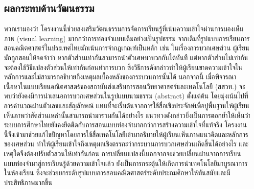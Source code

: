 \subsection*{ผลกระทบด้านวัฒนธรรม}
พวกเรามองว่า โครงงานนี้ช่วยส่งเสริมวัฒนธรรมการจัดการเรียนรู้ที่เน้นความเข้าใจผ่านการมองเห็นภาพ (visual learning) มากกว่าการท่องจำแบบเดิมอย่างเป็นรูปธรรม
จากเดิมที่รูปแบบการเรียนการสอนคณิตศาสตร์ในประเทศไทยมักเน้นการจำกฎเกณฑ์เป็นหลัก เช่น ในเรื่องการบวกเศษส่วน ผู้เรียนมักถูกสอนให้จดจำว่า หากตัวส่วนเท่ากันสามารถนำตัวเศษมาบวกกันได้ทันที 
แต่หากตัวส่วนไม่เท่ากัน จะต้องใช้วิธีแปลงตัวส่วนให้เท่ากันก่อนทำการบวก ซึ่งวิธีการดังกล่าวทำให้ผู้เรียนขาดความเข้าใจในหลักการและไม่สามารถอธิบายถึงเหตุผลเบื้องหลังของกระบวนการนั้นได้
นอกจากนี้ เมื่อพิจารณาเนื้อหาในแบบเรียนคณิตศาสตร์ของสถาบันส่งเสริมการสอนวิทยาศาสตร์และเทคโนโลยี (สสวท.) จะพบว่ายังคงมีการนำเสนอการบวกเศษส่วนในรูปแบบนามธรรม (abstract) ตั้งแต่ต้น 
โดยมุ่งเน้นไปที่การคำนวณผ่านตัวเลขและสัญลักษณ์ แทนที่จะเริ่มต้นจากการใช้สื่อเชิงประจักษ์เพื่อปูพื้นฐานให้ผู้เรียนเห็นภาพว่าสัดส่วนเหล่านั้นสามารถนำมารวมกันได้อย่างไร 
แนวทางดังกล่าวยิ่งเป็นการตอกย้ำให้เห็นว่าระบบการศึกษาไทยยังคงยึดติดกับการสอนแบบท่องจำมากกว่าการสร้างความเข้าใจที่แท้จริง
โครงงานนี้จึงเข้ามาช่วยแก้ไขปัญหาโดยการใช้สื่อเทคโนโลยีเข้ามาอธิบายให้ผู้เรียนเห็นภาพแนวคิดและหลักการของเศษส่วน ทำให้ผู้เรียนเข้าใจถึงเหตุผลเชิงตรรกะว่ากระบวนการบวกเศษส่วนเกิดขึ้นได้อย่างไร 
และเหตุใดจึงต้องปรับตัวส่วนให้เท่ากันก่อน การเปลี่ยนแปลงนี้นอกจากจะช่วยเปลี่ยนผ่านจากการเรียนแบบท่องจำมาสู่การเรียนรู้ด้วยความเข้าใจแล้ว ยังเป็นการกระตุ้นให้เกิดการนำเทคโนโลยีมาบูรณาการในห้องเรียน 
ซึ่งจะช่วยยกระดับรูปแบบการสอนคณิตศาสตร์ระดับประถมศึกษาให้ทันสมัยและมีประสิทธิภาพมากขึ้น